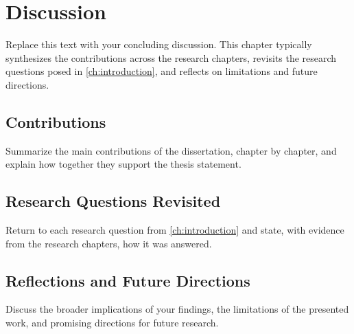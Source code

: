 
\chapter{Discussion}
\label{ch:discussion}

Replace this text with your concluding discussion.  This chapter
typically synthesizes the contributions across the research chapters,
revisits the research questions posed in \autoref{ch:introduction},
and reflects on limitations and future directions.

\section{Contributions}

Summarize the main contributions of the dissertation, chapter by
chapter, and explain how together they support the thesis statement.

\section{Research Questions Revisited}

Return to each research question from \autoref{ch:introduction} and
state, with evidence from the research chapters, how it was answered.

\section{Reflections and Future Directions}

Discuss the broader implications of your findings, the limitations of
the presented work, and promising directions for future research.

